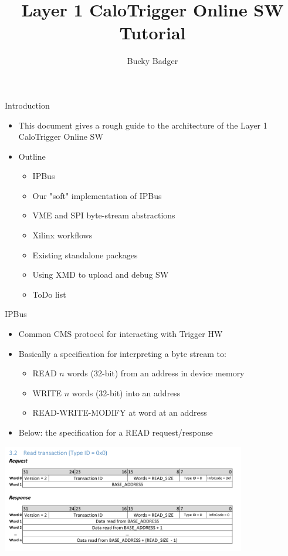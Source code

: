 \documentclass{beamer}
\title[UW Layer-1 SW Tutorial]{Layer 1 CaloTrigger Online SW Tutorial}
\author{Bucky Badger}
\institute{UW Madison}
\begin{document}
\begin{frame}
\titlepage
\end{frame}

\begin{frame}{Introduction}
\begin{itemize}
\item This document gives a rough guide to the architecture of the Layer 1 CaloTrigger Online SW
\item Outline
\begin{itemize}
\item IPBus
\item Our "soft" implementation of IPBus
\item VME and SPI byte-stream abstractions
\item Xilinx workflows
\item Existing standalone packages
\item Using XMD to upload and debug SW
\item ToDo list
\end{itemize}
\end{itemize}
\end{frame}

\begin{frame}{IPBus}
\begin{itemize}
\item Common CMS protocol for interacting with Trigger HW
\item Basically a specification for interpreting a byte stream to:
\begin{itemize}
\item READ $n$ words (32-bit) from an address in device memory 
\item WRITE $n$ words (32-bit) into an address
\item READ-WRITE-MODIFY at word at an address
\end{itemize}
\item Below: the specification for a READ request/response
\end{itemize}
\begin{center}
\includegraphics[width=0.8\textwidth]{images/ipbus_read.pdf}
\end{center}

\end{frame}
\end{document}
